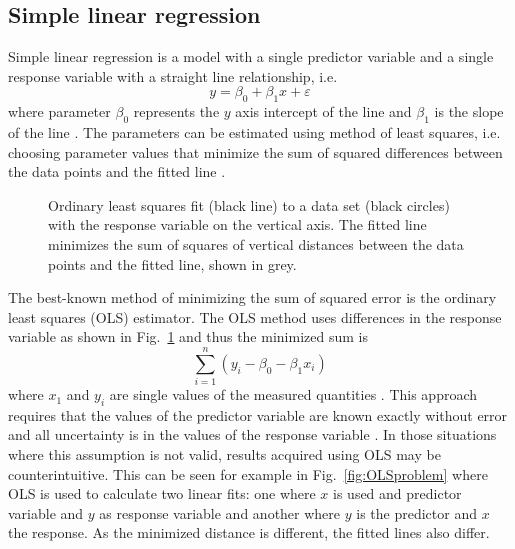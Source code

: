 \documentclass[english, oneside]{HYgradu}
\begin{document}
\subsection{Simple linear regression}\label{sect:simple-linear}
Simple linear regression is a model with a single predictor variable and a single response variable with a straight line relationship, i.e.
\begin{equation}
	y = \beta_0 + \beta_1 x + \varepsilon
\end{equation}
where parameter $\beta_0$ represents the $y$ axis intercept of the line and $\beta_1$ is the slope of the line \citep{montgomery2012introduction}. The parameters can be estimated using method of least squares, i.e. choosing parameter values that minimize the sum of squared differences between the data points and the fitted line \citep{montgomery2012introduction}. 

\begin{figure}
    \centering
    
    \caption{Ordinary least squares fit (black line) to a data set (black circles) with the response variable on the vertical axis. The fitted line minimizes the sum of squares of vertical distances between the data points and the fitted line, shown in grey.}\label{fig:OLS}
\end{figure}

The best-known method of minimizing the sum of squared error is the ordinary least squares (OLS) estimator. The OLS method uses differences in the response variable as shown in Fig.\ \ref{fig:OLS} and thus the minimized sum is
\begin{equation}
	\sum_{i=1}^n (y_i - \beta_0 - \beta_1 x_i)
\end{equation}
where $x_1$ and $y_i$ are single values of the measured quantities \citep{feigelson2012modern}. This approach requires that the values of the predictor variable are known exactly without error and all uncertainty is in the values of the response variable \citep{feigelson2012modern}. In those situations where this assumption is not valid, results acquired using OLS may be counterintuitive. This can be seen for example in Fig.\ \ref{fig:OLSproblem} where OLS is used to calculate two linear fits: one where $x$ is used and predictor variable and $y$ as response variable and another where $y$ is the predictor and $x$ the response. As the minimized distance is different, the fitted lines also differ.
\end{document}
